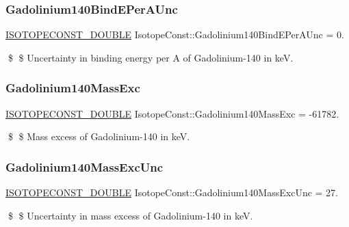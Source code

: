 \subsubsection{\texorpdfstring{Gadolinium140\+Bind\+E\+Per\+A\+Unc}{Gadolinium140BindEPerAUnc}}
{\footnotesize\ttfamily \mbox{\hyperlink{group___isotope_const-_macros_ga8f45a7272ce02c0b4c65c44636ed719a}{I\+S\+O\+T\+O\+P\+E\+C\+O\+N\+S\+T\+\_\+\+D\+O\+U\+B\+LE}} Isotope\+Const\+::\+Gadolinium140\+Bind\+E\+Per\+A\+Unc = 0.}

\$ \$ Uncertainty in binding energy per A of Gadolinium-\/140 in keV. \mbox{\label{group___isotope_const-_gadolinium-_gd140_ga0beb71508d4ee28a94d39d9f02ac788c}} 
\subsubsection{\texorpdfstring{Gadolinium140\+Mass\+Exc}{Gadolinium140MassExc}}
{\footnotesize\ttfamily \mbox{\hyperlink{group___isotope_const-_macros_ga8f45a7272ce02c0b4c65c44636ed719a}{I\+S\+O\+T\+O\+P\+E\+C\+O\+N\+S\+T\+\_\+\+D\+O\+U\+B\+LE}} Isotope\+Const\+::\+Gadolinium140\+Mass\+Exc = -\/61782.}

\$ \$ Mass excess of Gadolinium-\/140 in keV. \mbox{\label{group___isotope_const-_gadolinium-_gd140_ga723b5d590c78775ce388ecfa863e33dc}} 
\subsubsection{\texorpdfstring{Gadolinium140\+Mass\+Exc\+Unc}{Gadolinium140MassExcUnc}}
{\footnotesize\ttfamily \mbox{\hyperlink{group___isotope_const-_macros_ga8f45a7272ce02c0b4c65c44636ed719a}{I\+S\+O\+T\+O\+P\+E\+C\+O\+N\+S\+T\+\_\+\+D\+O\+U\+B\+LE}} Isotope\+Const\+::\+Gadolinium140\+Mass\+Exc\+Unc = 27.}

\$ \$ Uncertainty in mass excess of Gadolinium-\/140 in keV. \mbox{\label{group___isotope_const-_gadolinium-_gd140_ga6fda030ad54918231758e4f58e176120}} 
